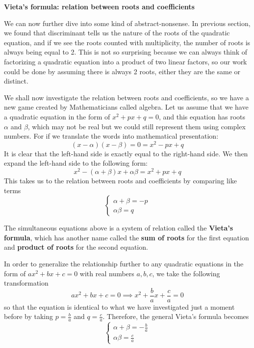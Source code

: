 \documentclass[12pt]{article}
\begin{document}
    \begin{center}
        \textbf{Vieta's formula: relation between roots and coefficients}
    \end{center}

    We can now further dive into some kind of abstract-nonsense. In previous section, we found that discriminant tells us the nature of the roots of the quadratic equation, and if we see the roots counted with multiplicity, the number of roots is always being equal to 2. This is not so surprising because we can always think of factorizing a quadratic equation into a product of two linear factors, so our work could be done by assuming there is always 2 roots, either they are the same or distinct.

    We shall now investigate the relation between roots and coefficients, so we have a new game created by Mathematicians called algebra. Let us assume that we have a quadratic equation in the form of $x^2+px+q=0$, and this equation has roots $\alpha$ and $\beta$, which may not be real but we could still represent them using complex numbers. For if we translate the words into mathematical presentation: $$(x-\alpha)(x-\beta)=0=x^2-px+q$$ It is clear that the left-hand side is exactly equal to the right-hand side. We then expand the left-hand side to the following form: $$x^2-(\alpha+\beta)x+\alpha\beta=x^2+px+q$$ This takes us to the relation between roots and coefficients by comparing like terms $$\begin{cases}
        \alpha+\beta=-p\\ 
        \alpha\beta=q
    \end{cases}$$

    The simultaneous equations above is a system of relation called the \textbf{Vieta's formula}, which has another name called the \textbf{sum of roots} for the first equation and \textbf{product of roots} for the second equation.

    In order to generalize the relationship further to any quadratic equations in the form of $ax^2+bx+c=0$ with real numbers $a,b,c$, we take the following transformation $$ax^2+bx+c=0 \implies x^2+\frac{b}{a}x+\frac{c}{a}=0$$ so that the equation is identical to what we have investigated just a moment before by taking $p=\frac{b}{a}$ and $q=\frac{c}{a}$. Therefore, the general Vieta's formula becomes $$\begin{cases}
        \alpha+\beta=-\frac{b}{a}\\ 
        \alpha\beta=\frac{c}{a}
    \end{cases}$$
\end{document}
